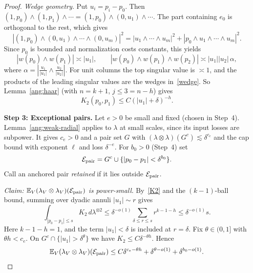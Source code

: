 \documentclass[11pt,reqno]{amsart}
\begin{document}
\begin{proof}
\emph{Wedge geometry.} Put $u_i=p_i-p_0$. Then $(1,p_0)\wedge(1,p_1)\wedge\cdots=(1,p_0)\wedge(0,u_1)\wedge\cdots$. The part containing $e_0$ is orthogonal to the rest, which gives
\[
|(1,p_0)\wedge(0,u_1)\wedge\cdots\wedge(0,u_m)|^2=|u_1\wedge\cdots\wedge u_m|^2+|p_0\wedge u_1\wedge\cdots\wedge u_m|^2 .
\]
Since $p_0$ is bounded and normalization costs constants, this yields
\begin{equation}\label{wedge}
 |w(p_0)\wedge w(p_1)|\asymp|u_1|,\qquad |w(p_0)\wedge w(p_1)\wedge w(p_2)|\asymp|u_1||u_2|\,\alpha,
\end{equation}
where $\alpha=|\tfrac{u_1}{|u_1|}\wedge\tfrac{u_2}{|u_2|}|$. For unit columns the top singular value is $\asymp1$, and the products of the leading singular values are the wedges in~\eqref{wedge}. So Lemma~\ref{ang:haar} (with $n=k+1$, $j\le3=n-h$) gives
\begin{equation}\label{K2}
K_2(p_0,p_1)\le C(|u_1|+\delta)^{-h}.
\end{equation}

\textbf{Step 3: Exceptional pairs.} Let $e>0$ be small and fixed (chosen in Step~4). Lemma~\ref{ang:weak-radial} applies to $\lambda$ at small scales, since its input losses are subpower. It gives $c_e>0$ and a pair set $G$ with $(\lambda\otimes\lambda)(G^c)\lesssim\delta^{c_e}$ and the cap bound with exponent $\ell$ and loss $\delta^{-e}$. For $b_0>0$ (Step~4) set
\[
\mathcal E_{\rm pair}=G^c\cup\{|p_0-p_1|<\delta^{b_0}\}.
\]
Call an anchored pair \emph{retained} if it lies outside $\mathcal E_{\rm pair}$.

\emph{Claim: $\mathbb E_V(\lambda_V\otimes\lambda_V)(\mathcal E_{\rm pair})$ is power-small.} By~\eqref{K2} and the $(k-1)$-ball bound, summing over dyadic annuli $|u_1|\sim r$ gives
\[
\int_{|p_0-p_1|\le s}K_2\,d\lambda^{\otimes2}\le\delta^{-o(1)}\sum_{\delta\le r\le s}r^{k-1-h}\le\delta^{-o(1)}s .
\]
Here $k-1-h=1$, and the term $|u_1|<\delta$ is included at $r=\delta$. Fix $\theta\in(0,1]$ with $\theta h<c_e$. On $G^c\cap\{|u_1|>\delta^\theta\}$ we have $K_2\le C\delta^{-\theta h}$. Hence
\[
\mathbb E_V(\lambda_V\otimes\lambda_V)(\mathcal E_{\rm pair})\le C\delta^{c_e-\theta h}+\delta^{\theta-o(1)}+\delta^{b_0-o(1)}.
\]


\end{proof}
\end{document}
